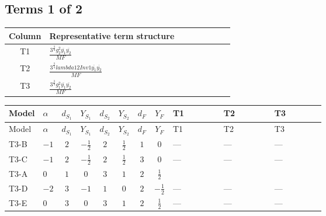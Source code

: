 \documentclass[8pt]{article}
\begin{document}
\begin{landscape}
\subsection*{Terms 1 of 2}
\begin{center}
\begin{tabular}{@{}c >{\raggedright\arraybackslash}p{0.82\linewidth}@{}}
\toprule
Column & Representative term structure \\
\midrule
T1 & \(\displaystyle \frac{3^{\frac{3}{4}} g_{2}^{2} \overline{y_{1}} \overline{y_{2}}}{MF}\) \\
\midrule
T2 & \(\displaystyle \frac{3^{\frac{3}{4}} lambda12Inv1 \overline{y_{1}} \overline{y_{2}}}{MF}\) \\
\midrule
T3 & \(\displaystyle \frac{3^{\frac{3}{4}} g_{1}^{2} \overline{y_{1}} \overline{y_{2}}}{MF}\) \\
\midrule
\bottomrule
\end{tabular}
\end{center}
\smallskip
\tiny
\begin{longtable}{@{}llcccccc >{\raggedright\arraybackslash}p{0.21\linewidth} >{\raggedright\arraybackslash}p{0.21\linewidth} >{\raggedright\arraybackslash}p{0.21\linewidth}@{}}
\toprule
Model & $\alpha$ & $d_{S_1}$ & $Y_{S_1}$ & $d_{S_2}$ & $Y_{S_2}$ & $d_F$ & $Y_F$ & T1 & T2 & T3 \\
\midrule
\endfirsthead
\toprule
Model & $\alpha$ & $d_{S_1}$ & $Y_{S_1}$ & $d_{S_2}$ & $Y_{S_2}$ & $d_F$ & $Y_F$ & T1 & T2 & T3 \\
\midrule
\endhead
T3-B & $-1$ & $2$ & $-\frac{1}{2}$ & $2$ & $\frac{1}{2}$ & $1$ & $0$ & --- & --- & --- \\
\midrule
T3-C & $-1$ & $2$ & $-\frac{1}{2}$ & $2$ & $\frac{1}{2}$ & $3$ & $0$ & --- & --- & --- \\
\midrule
T3-A & $0$ & $1$ & $0$ & $3$ & $1$ & $2$ & $\frac{1}{2}$ & \scriptsize\adjustbox{max width=\linewidth}{$\begin{gathered} - \frac{11 \cdot 3^{\frac{3}{4}} g_{2}^{2} \overline{y_{1}} \overline{y_{2}}}{8 MF}\end{gathered}$} & \scriptsize\adjustbox{max width=\linewidth}{$\begin{gathered} - \frac{3^{\frac{3}{4}} lambda12Inv1 \overline{y_{1}} \overline{y_{2}}}{6 MF}\end{gathered}$} & \scriptsize\adjustbox{max width=\linewidth}{$\begin{gathered} - \frac{3^{\frac{3}{4}} g_{1}^{2} \overline{y_{1}} \overline{y_{2}}}{8 MF}\end{gathered}$} \\
\midrule
T3-D & $-2$ & $3$ & $-1$ & $1$ & $0$ & $2$ & $-\frac{1}{2}$ & --- & --- & --- \\
\midrule
T3-E & $0$ & $3$ & $0$ & $3$ & $1$ & $2$ & $\frac{1}{2}$ & --- & --- & --- \\
\midrule
\bottomrule
\end{longtable}
\clearpage

\end{landscape}
\end{document}
